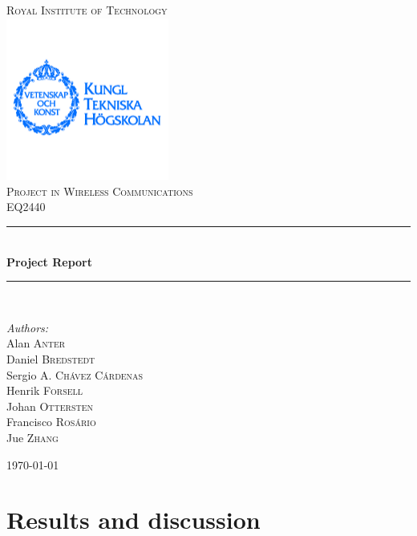 \documentclass[12pt,a4paper,openright]{report}
\newcommand{\HRule}{\rule{\linewidth}{0.5mm}}
\begin{document}
\begin{titlepage}
\begin{center}
\textsc{\LARGE Royal Institute of Technology}\\[0.3cm]
\includegraphics[width=0.4\textwidth]{./logo}~\\[0.3cm]


\textsc{\Large Project in Wireless Communications \\ EQ2440}\\[0.5cm]

\HRule \\[0.4cm]
{ \huge \bfseries Project Report \\[0.4cm] }

\HRule \\[1.5cm]

\begin{minipage}{0.4\textwidth}
\begin{flushleft} \large
\emph{Authors:}\\
Alan \textsc{Anter} \\
Daniel \textsc{Bredstedt}\\
Sergio A. \textsc{Chávez Cárdenas}\\
Henrik \textsc{Forsell}\\
Johan \textsc{Ottersten}\\
Francisco \textsc{Rosário}\\
Jue \textsc{Zhang}\\

\end{flushleft}
\end{minipage}
\vfill
{\large \today}



\end{center}
\end{titlepage}


\newpage\null\thispagestyle{empty}\newpage

\chapter{Results and discussion}
\end{document}
